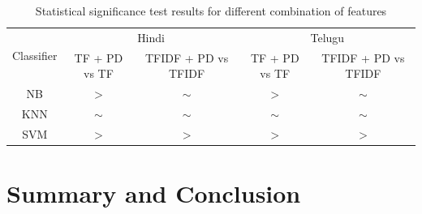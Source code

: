 \documentclass[times, 11pt, a4paper]{article}
\begin{document}
\begin{table}[!htbp]
\renewcommand{\arraystretch}{1.2}
\caption {Statistical significance test results for different combination of features \label{Table: Mcnemar result of significance test}}
\footnotesize\setlength{\tabcolsep}{2pt}
\centering
\begin{tabular}{|c|c|c||c|c|}
\hline
\multirow{2}{*}{Classifier} & \multicolumn{2}{c||}{Hindi} & \multicolumn{2}{c|}{Telugu} \\ \cline{2-5} 
 & TF + PD vs TF & TFIDF + PD vs TFIDF & TF + PD vs TF & TFIDF + PD vs TFIDF \\ \hline
NB & $>$ & $\sim$ & $>$ & $\sim$ \\ \hline
KNN & $\sim$ & $\sim$ & $\sim$ & $\sim$ \\ \hline
SVM & $>$ & $>$ & $>$ & $>$ \\ \hline
\end{tabular}
\end{table}	
	
\begin{table}[!htbp]
\renewcommand{\arraystretch}{1.2}
\caption{Statistical significance test results for cross-classifier performance \label{Table: Cross classifier significance test}}
\end{table} 


	
\section{Summary and Conclusion}
\end{document}
